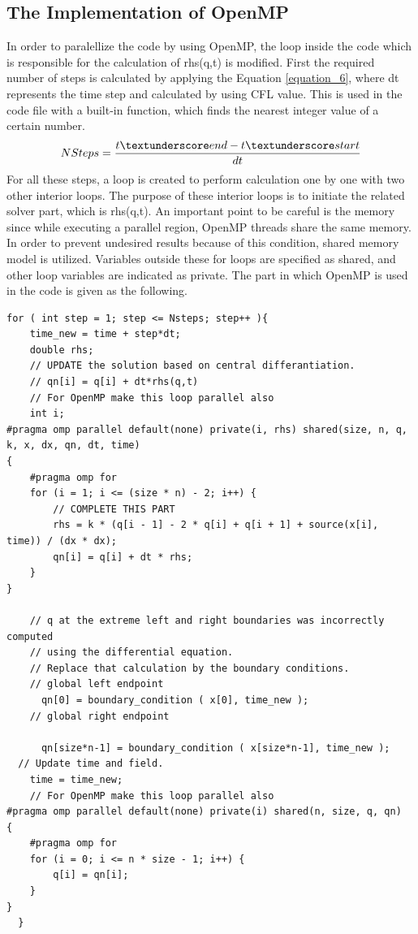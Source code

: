 \documentclass{article}
\begin{document}
\clearpage
\subsection{The Implementation of OpenMP}
In order to paralellize the code by using OpenMP, the loop inside the code which is responsible for the calculation of rhs(q,t) is modified. First the required number of steps is calculated by applying the Equation \ref{equation_6}, where dt represents the time step and calculated by using CFL value. This is used in the code file with a built-in function, which finds the nearest integer value of a certain number. 
\begin{equation}
    NSteps = \frac{t\textunderscore end - t\textunderscore start}{dt}
    \label{equation_6}
\end{equation}
For all these steps, a loop is created to perform calculation one by one with two other interior loops. The purpose of these interior loops is to initiate the related solver part, which is rhs(q,t). An important point to be careful is the memory since while executing a parallel region, OpenMP threads share the same memory. In order to prevent undesired results because of this condition, shared memory model is utilized. Variables outside these for loops are specified as shared, and other loop variables are indicated as private. The part in which OpenMP is used in the code is given as the following. 

\begin{verbatim}
for ( int step = 1; step <= Nsteps; step++ ){
    time_new = time + step*dt;
    double rhs;
    // UPDATE the solution based on central differantiation.
    // qn[i] = q[i] + dt*rhs(q,t)
    // For OpenMP make this loop parallel also
    int i;
#pragma omp parallel default(none) private(i, rhs) shared(size, n, q, k, x, dx, qn, dt, time)
{
    #pragma omp for
    for (i = 1; i <= (size * n) - 2; i++) {
        // COMPLETE THIS PART
        rhs = k * (q[i - 1] - 2 * q[i] + q[i + 1] + source(x[i], time)) / (dx * dx);
        qn[i] = q[i] + dt * rhs;
    }
}

    // q at the extreme left and right boundaries was incorrectly computed
    // using the differential equation.  
    // Replace that calculation by the boundary conditions.
    // global left endpoint 
      qn[0] = boundary_condition ( x[0], time_new );
    // global right endpoint 

      qn[size*n-1] = boundary_condition ( x[size*n-1], time_new );
  // Update time and field.
    time = time_new;
    // For OpenMP make this loop parallel also
#pragma omp parallel default(none) private(i) shared(n, size, q, qn)
{
    #pragma omp for
    for (i = 0; i <= n * size - 1; i++) {
        q[i] = qn[i];
    }
}
  }
\end{verbatim}
\end{document}

